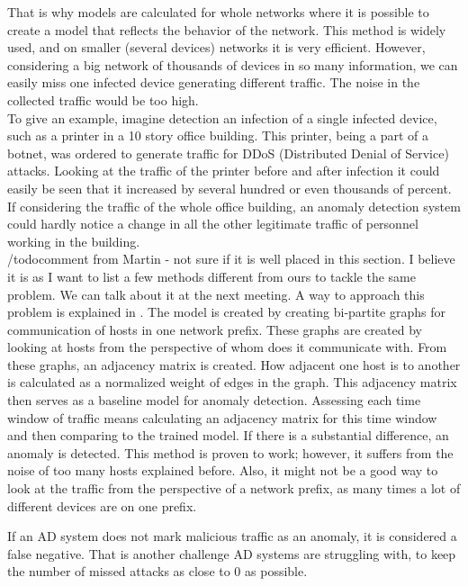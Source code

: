 \documentclass[thesis=B,english]{FITthesis}[2012/10/20]
\begin{document}
That is why models are calculated for whole networks where it is possible to create a model that reflects the behavior of the network.
This method is widely used, and on smaller (several devices) networks it is very efficient.
However, considering a big network of thousands of devices in so many information, we can easily miss one infected device generating different traffic.
The noise in the collected traffic would be too high. \\

To give an example, imagine detection an infection of a single infected device, such as a printer in a 10 story office building.
This printer, being a part of a botnet, was ordered to generate traffic for DDoS (Distributed Denial of Service) attacks.
Looking at the traffic of the printer before and after infection it could easily be seen that it increased by several hundred or even thousands of percent.
If considering the traffic of the whole office building, an anomaly detection system could hardly notice a change in all the other legitimate traffic of personnel working in the building. \\

/todo{comment from Martin - not sure if it is well placed in this section. I believe it is as I want to list a few methods different from ours to tackle the same problem. We can talk about it at the next meeting.}
A way to approach this problem is explained in \cite{xu2011network}.
The model is created by creating bi-partite graphs for communication of hosts in one network prefix.
These graphs are created by looking at hosts from the perspective of whom does it communicate with.
From these graphs, an adjacency matrix is created.
How adjacent one host is to another is calculated as a normalized weight of edges in the graph.
This adjacency matrix then serves as a baseline model for anomaly detection.
Assessing each time window of traffic means calculating an adjacency matrix for this time window and then comparing to the trained model.
If there is a substantial difference, an anomaly is detected.
This method is proven to work; however, it suffers from the noise of too many hosts explained before.
Also, it might not be a good way to look at the traffic from the perspective of a network prefix, as many times a lot of different devices are on one prefix. \\

If an AD system does not mark malicious traffic as an anomaly, it is considered a false negative.
That is another challenge AD systems are struggling with, to keep the number of missed attacks as close to 0 as possible. \\
\end{document}
